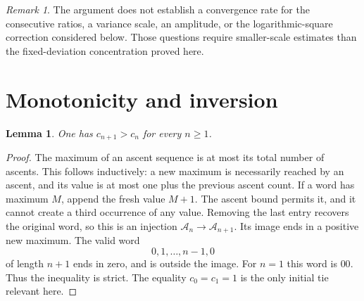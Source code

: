 \documentclass[11pt,letterpaper]{article}
\newtheorem{lemma}[theorem]{Lemma}
\theoremstyle{remark}
\newtheorem{remark}[theorem]{Remark}
\newcommand{\cA}{\mathcal A}
\begin{document}
\begin{remark}\label{a58:eg:rat:scope}
The argument does not establish a convergence rate for the consecutive ratios, a variance scale, an amplitude, or the logarithmic-square correction considered below. Those questions require smaller-scale estimates than the fixed-deviation concentration proved here.
\end{remark}

\section{Monotonicity and inversion}\label{a58:eg:sec:inverse}
\begin{lemma}\label{a58:eg:lem:monotonicity}
One has $c_{n+1}>c_n$ for every $n\ge1$.
\end{lemma}
\begin{proof}
The maximum of an ascent sequence is at most its total number of ascents. This follows inductively: a new maximum is necessarily reached by an ascent, and its value is at most one plus the previous ascent count. If a word has maximum $M$, append the fresh value $M+1$. The ascent bound permits it, and it cannot create a third occurrence of any value. Removing the last entry recovers the original word, so this is an injection $\cA_n\to\cA_{n+1}$. Its image ends in a positive new maximum. The valid word
\[
 0,1,\ldots,n-1,0
\]
of length $n+1$ ends in zero, and is outside the image. For $n=1$ this word is $00$. Thus the inequality is strict. The equality $c_0=c_1=1$ is the only initial tie relevant here.
\end{proof}
\end{document}

